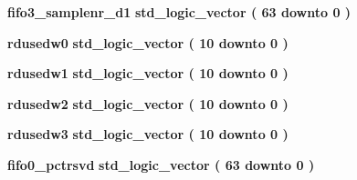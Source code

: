 \begin{DoxyCompactItemize}
\item 
{\bf fifo3\+\_\+samplenr\+\_\+d1} {\bfseries \textcolor{comment}{std\+\_\+logic\+\_\+vector}\textcolor{vhdlchar}{ }\textcolor{vhdlchar}{(}\textcolor{vhdlchar}{ }\textcolor{vhdlchar}{ } \textcolor{vhdldigit}{63} \textcolor{vhdlchar}{ }\textcolor{keywordflow}{downto}\textcolor{vhdlchar}{ }\textcolor{vhdlchar}{ } \textcolor{vhdldigit}{0} \textcolor{vhdlchar}{ }\textcolor{vhdlchar}{)}\textcolor{vhdlchar}{ }} 
\item 
{\bf rdusedw0} {\bfseries \textcolor{comment}{std\+\_\+logic\+\_\+vector}\textcolor{vhdlchar}{ }\textcolor{vhdlchar}{(}\textcolor{vhdlchar}{ }\textcolor{vhdlchar}{ } \textcolor{vhdldigit}{10} \textcolor{vhdlchar}{ }\textcolor{keywordflow}{downto}\textcolor{vhdlchar}{ }\textcolor{vhdlchar}{ } \textcolor{vhdldigit}{0} \textcolor{vhdlchar}{ }\textcolor{vhdlchar}{)}\textcolor{vhdlchar}{ }} 
\item 
{\bf rdusedw1} {\bfseries \textcolor{comment}{std\+\_\+logic\+\_\+vector}\textcolor{vhdlchar}{ }\textcolor{vhdlchar}{(}\textcolor{vhdlchar}{ }\textcolor{vhdlchar}{ } \textcolor{vhdldigit}{10} \textcolor{vhdlchar}{ }\textcolor{keywordflow}{downto}\textcolor{vhdlchar}{ }\textcolor{vhdlchar}{ } \textcolor{vhdldigit}{0} \textcolor{vhdlchar}{ }\textcolor{vhdlchar}{)}\textcolor{vhdlchar}{ }} 
\item 
{\bf rdusedw2} {\bfseries \textcolor{comment}{std\+\_\+logic\+\_\+vector}\textcolor{vhdlchar}{ }\textcolor{vhdlchar}{(}\textcolor{vhdlchar}{ }\textcolor{vhdlchar}{ } \textcolor{vhdldigit}{10} \textcolor{vhdlchar}{ }\textcolor{keywordflow}{downto}\textcolor{vhdlchar}{ }\textcolor{vhdlchar}{ } \textcolor{vhdldigit}{0} \textcolor{vhdlchar}{ }\textcolor{vhdlchar}{)}\textcolor{vhdlchar}{ }} 
\item 
{\bf rdusedw3} {\bfseries \textcolor{comment}{std\+\_\+logic\+\_\+vector}\textcolor{vhdlchar}{ }\textcolor{vhdlchar}{(}\textcolor{vhdlchar}{ }\textcolor{vhdlchar}{ } \textcolor{vhdldigit}{10} \textcolor{vhdlchar}{ }\textcolor{keywordflow}{downto}\textcolor{vhdlchar}{ }\textcolor{vhdlchar}{ } \textcolor{vhdldigit}{0} \textcolor{vhdlchar}{ }\textcolor{vhdlchar}{)}\textcolor{vhdlchar}{ }} 
\item 
{\bf fifo0\+\_\+pctrsvd} {\bfseries \textcolor{comment}{std\+\_\+logic\+\_\+vector}\textcolor{vhdlchar}{ }\textcolor{vhdlchar}{(}\textcolor{vhdlchar}{ }\textcolor{vhdlchar}{ } \textcolor{vhdldigit}{63} \textcolor{vhdlchar}{ }\textcolor{keywordflow}{downto}\textcolor{vhdlchar}{ }\textcolor{vhdlchar}{ } \textcolor{vhdldigit}{0} \textcolor{vhdlchar}{ }\textcolor{vhdlchar}{)}\textcolor{vhdlchar}{ }} 

\end{DoxyCompactItemize}
